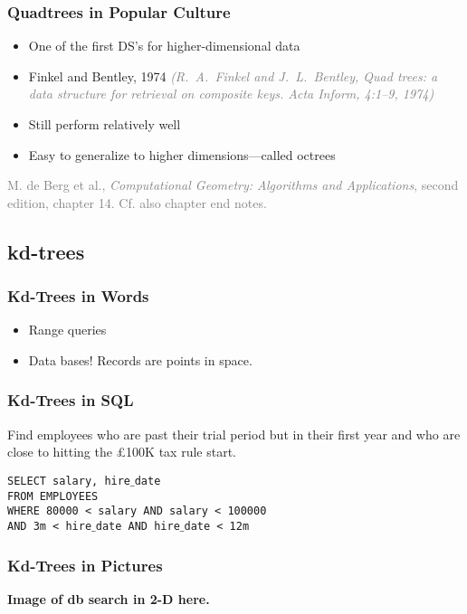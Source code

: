 \documentclass{beamer}
\begin{document}
\begin{frame}
  \frametitle{Quadtrees in Popular Culture}

  \begin{itemize}
  \item One of the first DS's for higher-dimensional data
  \item Finkel and Bentley, 1974
    \textcolor{gray}{\small\it(R.~A.~Finkel and J.~L.~Bentley, Quad
      trees: a data structure for retrieval on composite keys. Acta
      Inform, 4:1--9, 1974)}
  \item Still perform relatively well
  \item Easy to generalize to higher dimensions---called octrees
  \end{itemize}

  \bigskip \textcolor{gray}{M. de Berg et al., \textit{Computational
      Geometry: Algorithms and Applications}, second edition, chapter
    14.  Cf. also chapter end notes.}
\end{frame}

\subsection{kd-trees}

\begin{frame}
  \frametitle{Kd-Trees in Words}
  \begin{itemize}
  \item Range queries
    \pause
  \item Data bases!  Records are points in space.
  \end{itemize}
\end{frame}

\begin{frame}
  \frametitle{Kd-Trees in SQL}

  Find employees who are past their trial period but in their first
  year and who are close to hitting the \pounds 100K tax rule start.

  \bigskip

  \texttt{SELECT salary, hire$\_$date\\
  FROM EMPLOYEES\\
  WHERE 80000 < salary AND salary < 100000\\
  AND 3m < hire$\_$date AND hire$\_$date < 12m}
\end{frame}

\begin{frame}
  \frametitle{Kd-Trees in Pictures}

  \textbf{\Huge Image of db search in 2-D here.}  
\end{frame}
\end{document}
